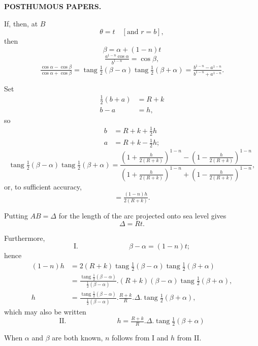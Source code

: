 \par\clearpage
\noindent{}\hfill{\small\textbf{POSTHUMOUS PAPERS.}}\hfill\null\par\medskip
\begingroup
\setlength{\abovedisplayskip}{4pt}\setlength{\belowdisplayskip}{4pt}
\setlength{\abovedisplayshortskip}{2pt}\setlength{\belowdisplayshortskip}{2pt}
\par\noindent\hspace*{\parindent}If, then, at \(B\)
\[\theta=t\quad[\text{and }r=b],\]
\noindent then
\[\beta=\alpha+(1-n)t\]
\noindent [and]
\[\tfrac{a^{1-n}\cos\alpha}{b^{1-n}}=\cos\beta,\]
\noindent [so that]
\[\tfrac{\cos\alpha-\cos\beta}{\cos\alpha+\cos\beta}=\operatorname{tang}\tfrac12(\beta-\alpha)\operatorname{tang}\tfrac12(\beta+\alpha)=\tfrac{b^{1-n}-a^{1-n}}{b^{1-n}+a^{1-n}}.\]
\par\noindent\hspace*{\parindent}Set
\[\begin{aligned}\tfrac12(b+a)&=R+k\\b-a&=h,\end{aligned}\]
\noindent so
\[\begin{aligned}b&=R+k+\tfrac12h\\a&=R+k-\tfrac12h;\end{aligned}\]
\noindent [then:]
\[\operatorname{tang}\tfrac12(\beta-\alpha)\operatorname{tang}\tfrac12(\beta+\alpha)=\frac{\left(1+\tfrac{h}{2(R+k)}\right)^{1-n}-\left(1-\tfrac{h}{2(R+k)}\right)^{1-n}}{\left(1+\tfrac{h}{2(R+k)}\right)^{1-n}+\left(1-\tfrac{h}{2(R+k)}\right)^{1-n}},\]
\noindent or, to sufficient accuracy,
\[=\tfrac{(1-n)h}{2(R+k)}.\]
\par\noindent\hspace*{\parindent}Putting \(AB=\Delta\) for the length of the arc projected onto sea level gives
\[\Delta=Rt.\]
\par\noindent\hspace*{\parindent}Furthermore,
\[\text{I.}\hspace{3cm}\beta-\alpha=(1-n)t;\]
\noindent hence
\[\begin{aligned}
(1-n)h&=2(R+k)\operatorname{tang}\tfrac12(\beta-\alpha)\operatorname{tang}\tfrac12(\beta+\alpha)\\
&=\tfrac{\operatorname{tang}\frac12(\beta-\alpha)}{\frac12(\beta-\alpha)}.(R+k)(\beta-\alpha)\operatorname{tang}\tfrac12(\beta+\alpha),\\
h&=\tfrac{\operatorname{tang}\frac12(\beta-\alpha)}{\frac12(\beta-\alpha)}.\tfrac{R+k}{R}.\Delta.\operatorname{tang}\tfrac12(\beta+\alpha),
\end{aligned}\]
\noindent which may also be written
\[\text{II.}\hspace{3cm}h=\tfrac{R+k}{R}.\Delta.\operatorname{tang}\tfrac12(\beta+\alpha)\]
\par\noindent\hspace*{\parindent}When \(\alpha\) and \(\beta\) are both known, \(n\) follows from I and \(h\) from II.
\endgroup

